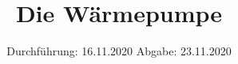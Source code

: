 

\subject{VERSUCH 206}
\title{Die Wärmepumpe}
\date{%
  Durchführung: 16.11.2020
  \hspace{3em}
  Abgabe: 23.11.2020
}



\maketitle
\thispagestyle{empty}
\tableofcontents
\newpage








\printbibliography{}


